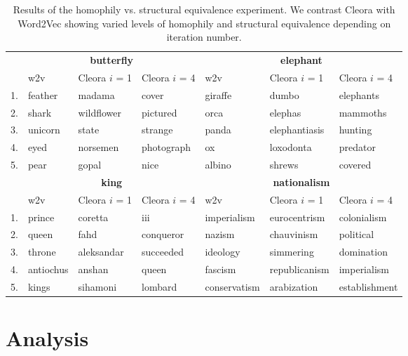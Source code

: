\documentclass{IEEEtran}
\begin{document}
\begin{table*}
    \centering


\begin{tabular}{l|lll|lll} 
 & \multicolumn{3}{c}{\textbf{butterfly}}
 & \multicolumn{3}{c}{\textbf{elephant}} \\

 & w2v & Cleora $i$ = 1 & Cleora $i$ = 4
 & w2v & Cleora $i$ = 1 & Cleora $i$ = 4
 \\\hline
 
 1. & feather & madama & cover & giraffe & dumbo & elephants  \\                        
 2. & shark & wildflower & pictured & orca & elephas & mammoths \\                      
 3. & unicorn & state & strange & panda & elephantiasis & hunting \\                      
 4. & eyed & norsemen & photograph &  ox & loxodonta & predator   \\
 5. & pear & gopal & nice & albino & shrews & covered \\ 
 \hline
& \multicolumn{3}{c}{\textbf{king}} 
 & \multicolumn{3}{c}{\textbf{nationalism}} \\
 & w2v & Cleora $i$ = 1 & Cleora $i$ = 4 
 & w2v & Cleora $i$ = 1 & Cleora $i$ = 4 \\\hline
 
 1. & prince & coretta & iii & imperialism & eurocentrism & colonialism \\ 
 2. & queen & fahd & conqueror & nazism & chauvinism & political \\                    
 3. & throne & aleksandar & succeeded & ideology & simmering & domination\\ 
 4. & antiochus & anshan & queen & fascism & republicanism & imperialism\\          
 5. & kings & sihamoni & lombard & conservatism & arabization & establishment\\

\end{tabular} 
\caption{Results of the homophily vs. structural equivalence experiment. We contrast Cleora with Word2Vec \cite{Word2Vec} showing varied levels of homophily and structural equivalence depending on iteration number.}
\label{tab-struct-vs-functional}
\end{table*}


\section{Analysis}
\end{document}
